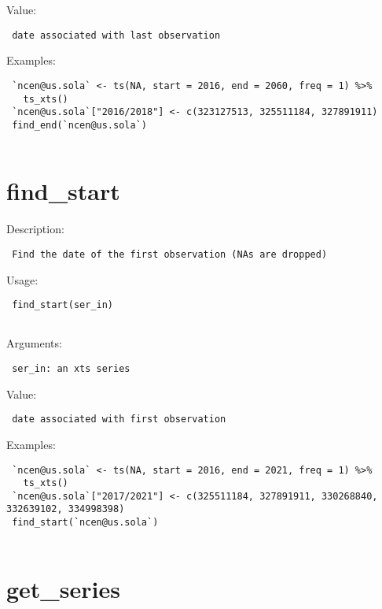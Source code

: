 \documentclass[
  letterpaper,
  DIV=11,
  numbers=noendperiod]{scrreport}
\begin{document}
Value:

\begin{verbatim}
 date associated with last observation
\end{verbatim}

Examples:

\begin{verbatim}
 `ncen@us.sola` <- ts(NA, start = 2016, end = 2060, freq = 1) %>% 
   ts_xts()
 `ncen@us.sola`["2016/2018"] <- c(323127513, 325511184, 327891911)
 find_end(`ncen@us.sola`)
 
\end{verbatim}

\hypertarget{find_start}{%
\section{find\_start}\label{find_start}}

Description:

\begin{verbatim}
 Find the date of the first observation (NAs are dropped)
\end{verbatim}

Usage:

\begin{verbatim}
 find_start(ser_in)
 
\end{verbatim}

Arguments:

\begin{verbatim}
 ser_in: an xts series
\end{verbatim}

Value:

\begin{verbatim}
 date associated with first observation
\end{verbatim}

Examples:

\begin{verbatim}
 `ncen@us.sola` <- ts(NA, start = 2016, end = 2021, freq = 1) %>% 
   ts_xts()
 `ncen@us.sola`["2017/2021"] <- c(325511184, 327891911, 330268840, 332639102, 334998398)
 find_start(`ncen@us.sola`)
 
\end{verbatim}

\hypertarget{get_series}{%
\section{get\_series}\label{get_series}}
\end{document}
